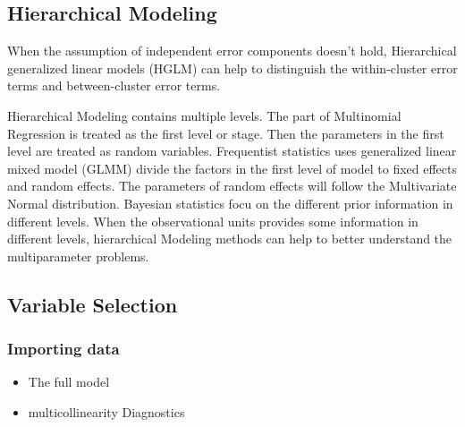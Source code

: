 \documentclass[numbered]{trbunofficial}
\begin{document}
\hypertarget{hierarchical-modeling}{%
\subsection{Hierarchical Modeling}\label{hierarchical-modeling}}

When the assumption of independent error components doesn't hold, Hierarchical generalized linear models (HGLM) can help to distinguish the within-cluster error terms and between-cluster error terms.

Hierarchical Modeling contains multiple levels. The part of Multinomial Regression is treated as the first level or stage. Then the parameters in the first level are treated as random variables.
Frequentist statistics uses generalized linear mixed model (GLMM) divide the factors in the first level of model to fixed effects and random effects. The parameters of random effects will follow the Multivariate Normal distribution.
Bayesian statistics focu on the different prior information in different levels.
When the observational units provides some information in different levels, hierarchical Modeling methods can help to better understand the multiparameter problems.

\hypertarget{variable-selection}{%
\subsection{Variable Selection}\label{variable-selection}}

\hypertarget{importing-data}{%
\subsubsection{Importing data}\label{importing-data}}

\begin{itemize}
\item
  The full model
\item
  multicollinearity Diagnostics
\end{itemize}

\begin{Shaded}
\begin{Highlighting}[]
\StringTok{ }\OperatorTok{\textasciitilde{}}\StringTok{ }
\OperatorTok{::}
\OperatorTok{::}
\end{Highlighting}
\end{Shaded}
\end{document}
